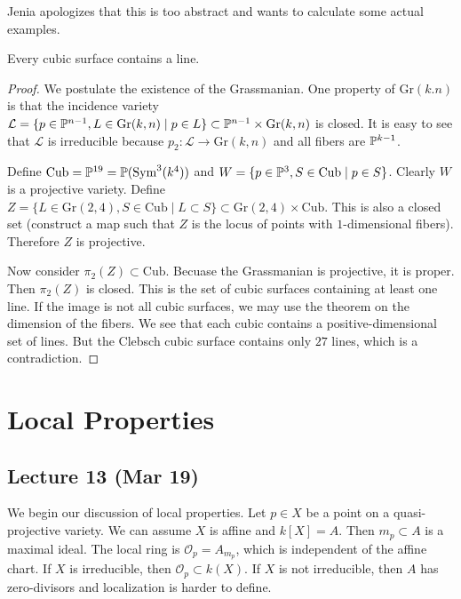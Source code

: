 \documentclass[twoside, 10pt]{article}
\begin{document}
    Jenia apologizes that this is too abstract and wants to calculate some actual examples.

    \begin{thm}
        Every cubic surface contains a line.
        \begin{proof}
            We postulate the existence of the Grassmanian. One property of $\mathrm{Gr}(k.n)$ is that the incidence variety $\mathcal{L} = \{p \in \P^{n-1}, L \in \mathrm{Gr}(k,n) \mid p \in L\} \subset \P^{n-1} \times \mathrm{Gr}(k,n)$ is closed. It is easy to see that $\mathcal{L}$ is irreducible because $p_2: \mathcal{L} \to \mathrm{Gr}(k,n)$ and all fibers are $\P^{k-1}$.

            Define $\mathrm{Cub} = \P^{19} = \P(\mathrm{Sym}^3(k^4))$ and $W = \{p \in \P^3, S \in \mathrm{Cub} \mid p \in S\}$. Clearly $W$ is a projective variety. Define $Z = \{L \in \mathrm{Gr}(2,4), S \in \mathrm{Cub} \mid L \subset S\} \subset \mathrm{Gr}(2,4) \times \mathrm{Cub}$. This is also a closed set (construct a map such that $Z$ is the locus of points with $1$-dimensional fibers). Therefore $Z$ is projective.

            Now consider $\pi_2(Z) \subset \mathrm{Cub}$. Becuase the Grassmanian is projective, it is proper. Then $\pi_2(Z)$ is closed. This is the set of cubic surfaces containing at least one line. If the image is not all cubic surfaces, we may use the theorem on the dimension of the fibers. We see that each cubic contains a positive-dimensional set of lines. But the Clebsch cubic surface contains only $27$ lines, which is a contradiction.
        \end{proof}
    \end{thm}

    \section{Local Properties}
    
    \subsection{Lecture 13 (Mar 19)}
    We begin our discussion of local properties. Let $p \in X$ be a point on a quasi-projective variety. We can assume $X$ is affine and $k[X] = A$. Then $m_p \subset A$ is a maximal ideal. The local ring is $\mathcal{O}_p = A_{m_p}$, which is independent of the affine chart. If $X$ is irreducible, then $\mathcal{O}_p \subset k(X)$. If $X$ is not irreducible, then $A$ has zero-divisors and localization is harder to define.
\end{document}
